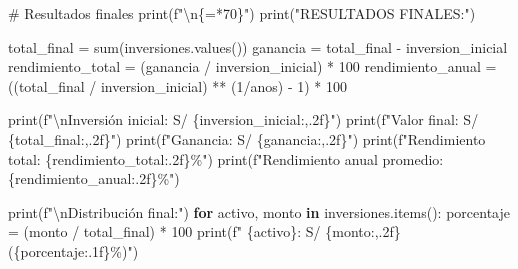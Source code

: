 \documentclass[
  doc,
  floatsintext,
  longtable,
  a4paper,
  nolmodern,
  notxfonts,
  notimes,
  12pt,
  colorlinks=true,linkcolor=blue,citecolor=blue,urlcolor=blue]{apa7}
\newenvironment{Shaded}{\begin{snugshade}}{\end{snugshade}}
\newcommand{\BuiltInTok}[1]{\textcolor[rgb]{0.00,0.23,0.31}{#1}}
\newcommand{\CharTok}[1]{\textcolor[rgb]{0.13,0.47,0.30}{#1}}
\newcommand{\CommentTok}[1]{\textcolor[rgb]{0.37,0.37,0.37}{#1}}
\newcommand{\ControlFlowTok}[1]{\textcolor[rgb]{0.00,0.23,0.31}{\textbf{#1}}}
\newcommand{\DecValTok}[1]{\textcolor[rgb]{0.68,0.00,0.00}{#1}}
\newcommand{\KeywordTok}[1]{\textcolor[rgb]{0.00,0.23,0.31}{\textbf{#1}}}
\newcommand{\NormalTok}[1]{\textcolor[rgb]{0.00,0.23,0.31}{#1}}
\newcommand{\OperatorTok}[1]{\textcolor[rgb]{0.37,0.37,0.37}{#1}}
\newcommand{\SpecialCharTok}[1]{\textcolor[rgb]{0.37,0.37,0.37}{#1}}
\newcommand{\SpecialStringTok}[1]{\textcolor[rgb]{0.13,0.47,0.30}{#1}}
\newcommand{\StringTok}[1]{\textcolor[rgb]{0.13,0.47,0.30}{#1}}
\begin{document}
\begin{Shaded}
\begin{Highlighting}[]
    \CommentTok{\# Resultados finales}
    \BuiltInTok{print}\NormalTok{(}\SpecialStringTok{f"}\CharTok{\textbackslash{}n}\SpecialCharTok{\{}\StringTok{\textquotesingle{}=\textquotesingle{}}\OperatorTok{*}\DecValTok{70}\SpecialCharTok{\}}\SpecialStringTok{"}\NormalTok{)}
    \BuiltInTok{print}\NormalTok{(}\StringTok{"RESULTADOS FINALES:"}\NormalTok{)}
    
\NormalTok{    total\_final }\OperatorTok{=} \BuiltInTok{sum}\NormalTok{(inversiones.values())}
\NormalTok{    ganancia }\OperatorTok{=}\NormalTok{ total\_final }\OperatorTok{{-}}\NormalTok{ inversion\_inicial}
\NormalTok{    rendimiento\_total }\OperatorTok{=}\NormalTok{ (ganancia }\OperatorTok{/}\NormalTok{ inversion\_inicial) }\OperatorTok{*} \DecValTok{100}
\NormalTok{    rendimiento\_anual }\OperatorTok{=}\NormalTok{ ((total\_final }\OperatorTok{/}\NormalTok{ inversion\_inicial) }\OperatorTok{**}\NormalTok{ (}\DecValTok{1}\OperatorTok{/}\NormalTok{anos) }\OperatorTok{{-}} \DecValTok{1}\NormalTok{) }\OperatorTok{*} \DecValTok{100}
    
    \BuiltInTok{print}\NormalTok{(}\SpecialStringTok{f"}\CharTok{\textbackslash{}n}\SpecialStringTok{Inversión inicial: S/ }\SpecialCharTok{\{}\NormalTok{inversion\_inicial}\SpecialCharTok{:,.2f\}}\SpecialStringTok{"}\NormalTok{)}
    \BuiltInTok{print}\NormalTok{(}\SpecialStringTok{f"Valor final: S/ }\SpecialCharTok{\{}\NormalTok{total\_final}\SpecialCharTok{:,.2f\}}\SpecialStringTok{"}\NormalTok{)}
    \BuiltInTok{print}\NormalTok{(}\SpecialStringTok{f"Ganancia: S/ }\SpecialCharTok{\{}\NormalTok{ganancia}\SpecialCharTok{:,.2f\}}\SpecialStringTok{"}\NormalTok{)}
    \BuiltInTok{print}\NormalTok{(}\SpecialStringTok{f"Rendimiento total: }\SpecialCharTok{\{}\NormalTok{rendimiento\_total}\SpecialCharTok{:.2f\}}\SpecialStringTok{\%"}\NormalTok{)}
    \BuiltInTok{print}\NormalTok{(}\SpecialStringTok{f"Rendimiento anual promedio: }\SpecialCharTok{\{}\NormalTok{rendimiento\_anual}\SpecialCharTok{:.2f\}}\SpecialStringTok{\%"}\NormalTok{)}
    
    \BuiltInTok{print}\NormalTok{(}\SpecialStringTok{f"}\CharTok{\textbackslash{}n}\SpecialStringTok{Distribución final:"}\NormalTok{)}
    \ControlFlowTok{for}\NormalTok{ activo, monto }\KeywordTok{in}\NormalTok{ inversiones.items():}
\NormalTok{        porcentaje }\OperatorTok{=}\NormalTok{ (monto }\OperatorTok{/}\NormalTok{ total\_final) }\OperatorTok{*} \DecValTok{100}
        \BuiltInTok{print}\NormalTok{(}\SpecialStringTok{f"  }\SpecialCharTok{\{}\NormalTok{activo}\SpecialCharTok{\}}\SpecialStringTok{: S/ }\SpecialCharTok{\{}\NormalTok{monto}\SpecialCharTok{:,.2f\}}\SpecialStringTok{ (}\SpecialCharTok{\{}\NormalTok{porcentaje}\SpecialCharTok{:.1f\}}\SpecialStringTok{\%)"}\NormalTok{)}
    

\end{Highlighting}
\end{Shaded}
\end{document}
